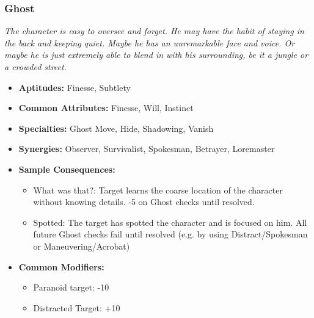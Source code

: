 \subsubsection{Ghost}\label{Ghost}
\textit{The character is easy to oversee and forget.
He may have the habit of staying in the back and keeping quiet.
Maybe he has an unremarkable face and voice.
Or maybe he is just extremely able to blend in with his surrounding, be it a jungle or a crowded street.}
\begin{itemize}
	\item \textbf{Aptitudes:} Finesse, Subtlety
	\item \textbf{Common Attributes:} Finesse, Will, Instinct
	\item \textbf{Specialties:} Ghost Move, Hide, Shadowing, Vanish
	\item \textbf{Synergies:} Observer, Survivalist, Spokesman, Betrayer, Loremaster
	\item \textbf{Sample Consequences:} 
	\begin{itemize}
		\item What was that?: Target learns the coarse location of the character without knowing details. -5 on Ghost checks until resolved.
		\item Spotted: The target has spotted the character and is focused on him. All future Ghost checks fail until resolved (e.g. by using Distract/Spokesman or Maneuvering/Acrobat)
	\end{itemize}
	\item \textbf{Common Modifiers:}
	\begin{itemize}
		\item Paranoid target: -10
		\item Distracted Target: +10
	\end{itemize}
\end{itemize}

